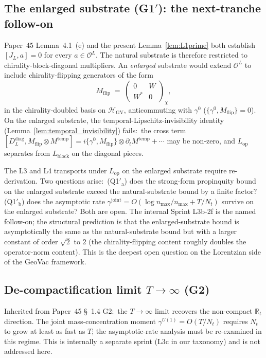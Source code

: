 \documentclass[11pt,a4paper]{article}
\theoremstyle{plain}
\theoremstyle{definition}
\newcommand{\nmax}{n_{\max}}
\newcommand{\Nt}{N_{t}}
\newcommand{\Op}{\mathcal{O}}
\newcommand{\R}{\mathbb{R}}
\newcommand{\Uone}{U(1)}
\newcommand{\Ddiag}{D_{L}^{\mathrm{diag}}}
\newcommand{\JL}{J_{L}}
\newcommand{\Lop}{L_{\mathrm{op}}}
\newcommand{\Lblock}{L_{\mathrm{block}}}
\newcommand{\gammajoint}{\gamma^{\mathrm{joint}}}
\newcommand{\gammaU}{\gamma^{\Uone}}
\newcommand{\HGV}{\mathcal{H}_{\mathrm{GV}}}
\newcommand{\temp}{\mathrm{temp}}
\begin{document}
\subsection{The enlarged substrate (G1$'$): the next-tranche follow-on}
\label{sec:enlarged_substrate}

Paper~45 Lemma~4.1~(e) and the present
Lemma~\ref{lem:L1prime} both establish $[\JL, a] = 0$ for every
$a \in \Op^{L}$. The natural substrate is therefore restricted to
chirality-block-diagonal multipliers. An \emph{enlarged} substrate
would extend $\Op^{L}$ to include chirality-flipping generators of the
form
\begin{equation}\label{eq:flip_generator}
   M_{\mathrm{flip}} \;=\; \begin{pmatrix} 0 & W \\ W^{*} & 0 \end{pmatrix}_{\chi},
\end{equation}
in the chirality-doubled basis on $\HGV$, anticommuting with
$\gamma^{0}$ ($\{\gamma^{0}, M_{\mathrm{flip}}\} = 0$). On the
enlarged substrate, the temporal-Lipschitz-invisibility identity
(Lemma~\ref{lem:temporal_invisibility}) fails:\ the cross term
$[\Ddiag, M_{\mathrm{flip}} \otimes M^{\temp}] =
i \{\gamma^{0}, M_{\mathrm{flip}}\} \otimes \partial_{t} M^{\temp} +
\cdots$ may be non-zero, and $\Lop$ separates from $\Lblock$ on the
diagonal pieces.

The L3 and L4 transports under $\Lop$ on the enlarged substrate
require re-derivation. Two questions arise:\ (Q1$'_{\mathrm{a}}$)
does the strong-form propinquity bound on the enlarged substrate
exceed the natural-substrate bound by a finite factor? (Q1$'_{\mathrm{b}}$)
does the asymptotic rate $\gammajoint = O(\log\nmax/\nmax + T/\Nt)$
survive on the enlarged substrate? Both are open. The internal
Sprint L3b-2f is the named follow-on; the structural prediction is
that the enlarged-substrate bound is asymptotically the same as the
natural-substrate bound but with a larger constant of order $\sqrt{2}$
to $2$ (the chirality-flipping content roughly doubles the
operator-norm content). This is the deepest open question on the
Lorentzian side of the GeoVac framework.

\subsection{De-compactification limit $T \to \infty$ (G2)}
\label{sec:decompactification}

Inherited from Paper~45 \S~1.4 G2:\ the $T \to \infty$ limit recovers
the non-compact $\R_{t}$ direction. The joint mass-concentration moment
$\gammaU = O(T/\Nt)$ requires $\Nt$ to grow at least as fast as $T$;
the asymptotic-rate analysis must be re-examined in this regime. This
is internally a separate sprint (L3c in our taxonomy) and is not
addressed here.
\end{document}
